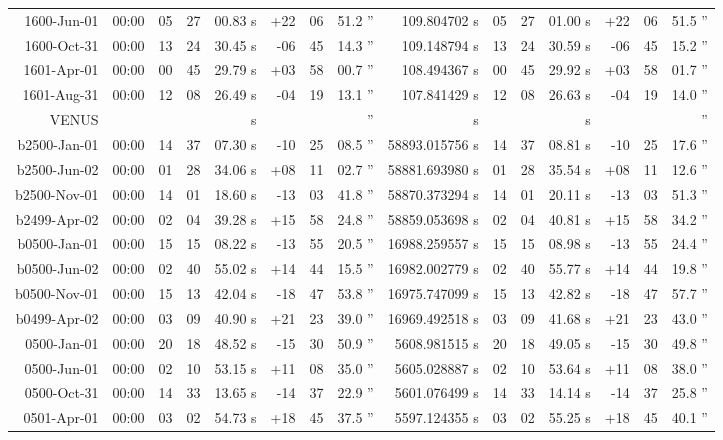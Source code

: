 \begin{longtable}{r@{\,}r|r@{h}r@{m}r<{s}|r@{°}r@{'}r<{''}|r<{s}||r@{h}r@{m}r<{s}|r@{°}r@{'}r<{''}}
 1600-Jun-01 &00:00   &  05 & 27 & 00.83 & +22 & 06 & 51.2  &   109.804702 & 05&27&01.00 & +22&06&51.5 \\ %
 1600-Oct-31 &00:00   &  13 & 24 & 30.45 & -06 & 45 & 14.3  &   109.148794 & 13&24&30.59 & -06&45&15.2 \\ %
 1601-Apr-01 &00:00   &  00 & 45 & 29.79 & +03 & 58 & 00.7  &   108.494367 & 00&45&29.92 & +03&58&01.7 \\ %
 1601-Aug-31 &00:00   &  12 & 08 & 26.49 & -04 & 19 & 13.1  &   107.841429 & 12&08&26.63 & -04&19&14.0 \\ %
VENUS\\ 
b2500-Jan-01 &00:00   &  14 & 37 & 07.30 & -10 & 25 & 08.5  & 58893.015756 & 14&37&08.81 & -10&25&17.6 \\ %
b2500-Jun-02 &00:00   &  01 & 28 & 34.06 & +08 & 11 & 02.7  & 58881.693980 & 01&28&35.54 & +08&11&12.6 \\ %
b2500-Nov-01 &00:00   &  14 & 01 & 18.60 & -13 & 03 & 41.8  & 58870.373294 & 14&01&20.11 & -13&03&51.3 \\ %
b2499-Apr-02 &00:00   &  02 & 04 & 39.28 & +15 & 58 & 24.8  & 58859.053698 & 02&04&40.81 & +15&58&34.2 \\ %
b0500-Jan-01 &00:00   &  15 & 15 & 08.22 & -13 & 55 & 20.5  & 16988.259557 & 15&15&08.98 & -13&55&24.4 \\ %
b0500-Jun-02 &00:00   &  02 & 40 & 55.02 & +14 & 44 & 15.5  & 16982.002779 & 02&40&55.77 & +14&44&19.8 \\ %
b0500-Nov-01 &00:00   &  15 & 13 & 42.04 & -18 & 47 & 53.8  & 16975.747099 & 15&13&42.82 & -18&47&57.7 \\ %
b0499-Apr-02 &00:00   &  03 & 09 & 40.90 & +21 & 23 & 39.0  & 16969.492518 & 03&09&41.68 & +21&23&43.0 \\ %
 0500-Jan-01 &00:00   &  20 & 18 & 48.52 & -15 & 30 & 50.9  &  5608.981515 & 20&18&49.05 & -15&30&49.8 \\ %
 0500-Jun-01 &00:00   &  02 & 10 & 53.15 & +11 & 08 & 35.0  &  5605.028887 & 02&10&53.64 & +11&08&38.0 \\ %
 0500-Oct-31 &00:00   &  14 & 33 & 13.65 & -14 & 37 & 22.9  &  5601.076499 & 14&33&14.14 & -14&37&25.8 \\ %
 0501-Apr-01 &00:00   &  03 & 02 & 54.73 & +18 & 45 & 37.5  &  5597.124355 & 03&02&55.25 & +18&45&40.1 \\ %

\end{longtable}
